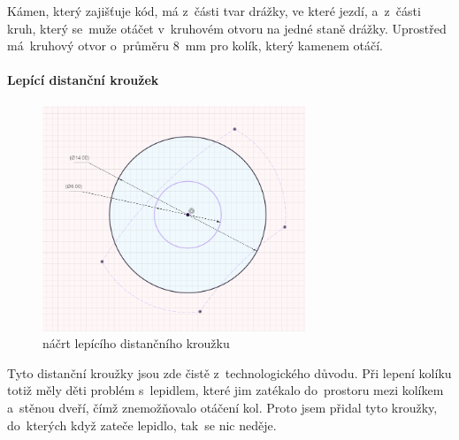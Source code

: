 Kámen, který zajišťuje kód, má z~části tvar drážky, ve které jezdí, a~z~části kruh, který se~muže otáčet v~kruhovém otvoru na jedné staně drážky.
Uprostřed má~kruhový otvor o~průměru 8~mm pro kolík, který kamenem otáčí.

\paragraph{Lepící distanční kroužek}

\begin{figure}[h]
	\centering
    \includegraphics[width=0.7\textwidth]{kapitoly/obrazky/M3/lepici_distance.png}
    \caption{náčrt lepícího distančního kroužku}
    \label{fig:M3-lepici-distance}
\end{figure}

Tyto distanční kroužky jsou zde čistě z~technologického důvodu. Při lepení kolíku totiž měly děti problém s~lepidlem, které jim zatékalo do~prostoru mezi kolíkem 
a~stěnou dveří, čímž znemožňovalo otáčení kol. Proto jsem přidal tyto kroužky, do~kterých když zateče lepidlo, tak~se nic neděje.

\newpage